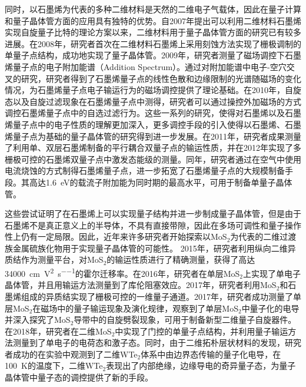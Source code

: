     同时，以石墨烯为代表的多种二维材料是天然的二维电子气载体，因此在量子计算和量子晶体管方面的应用具有独特的优势。自2007年提出可以利用二维材料石墨烯实现自旋量子比特的理论方案以来，二维材料用于量子晶体管方面的研究已有较多进展。在2008年，研究者首次在二维材料石墨烯上采用刻蚀方法实现了栅极调制的单量子点结构，成功地实现了量子晶体管。2009年，研究者测量了磁场调控下石墨烯量子点的电子附加能谱（Addition Spectrum）。通过对附加能谱中电子-空穴交叉的研究，研究者得到了石墨烯量子点的线性色散和边缘限制的光谱随磁场的变化情况，为石墨烯量子点电子输运行为的磁场调控提供了理论基础。在2010年，自旋态以及自旋过滤现象在石墨烯量子点中测得，研究者可以通过操控外加磁场的方式调控石墨烯量子点中的自选过滤行为。这些一系列的研究，使得对石墨烯以及石墨烯量子点中的电子性质的理解更加深入，更多调控手段的引入使得以石墨烯、石墨烯量子点为基础的量子晶体管的研究得到进一步发展。在2011年，研究者成果测量了利用单、双层石墨烯制备的平行耦合双量子点的输运性质，并在2012年实现了多栅极可控的石墨烯双量子点中激发态能级的测量。同年，研究者通过在空气中使用电流烧蚀的方式制得石墨烯量子点，进一步拓宽了石墨烯量子点的大规模制备手段。其高达\SI{1.6}{\electronvolt}的载流子附加能为同时期的最高水平，可用于制备单量子晶体管。

    这些尝试证明了在石墨烯上可以实现量子结构并进一步制成量子晶体管，但是由于石墨烯不是真正意义上的半导体，不具有直接带隙，因此在多场可调性和量子操作性上仍有一定局限。因此，近年来许多研究者开始探索以MoS$_2$为代表的二维过渡族金属硫族化物用于实现量子晶体管的可能性。
    2015年，研究者利用纵向二维异质结作为测量平台，对MoS$_2$的输运性质进行了精确测量，获得了高达\SI{34000}{\centi\meter\per\volt\squared\per\second}的霍尔迁移率。在2016年，研究者在单层MoS$_2$上实现了单电子晶体管，并且用输运方法测量到了库伦阻塞效应。2017年，研究者利用MoS$_2$和石墨烯组成的异质结实现了栅极可控的一维量子通道。2017年，研究者成功测量了单层MoS$_2$在磁场中的量子输运现象及演化规律，观察到了单层MoS$_2$中量子化的电导并深入探究了MoS$_2$导带中的自旋劈裂现象，可用于制备新型二维量子自旋器件。在2018年，研究者在二维MoS$_2$中实现了门控的单量子点结构，并利用量子输运方法测量到了单电子的电荷态和激子态。同时，由于二维拓朴层状材料的发现，研究者成功的在实验中观测到了二维WTe$_2$体系中由边界态传输的量子化电导，在\SI{100}{\kelvin}的温度下，二维WTe$_2$表现出了内部绝缘，边缘导电的奇异量子态，为量子晶体管中量子态的调控提供了新的手段。

